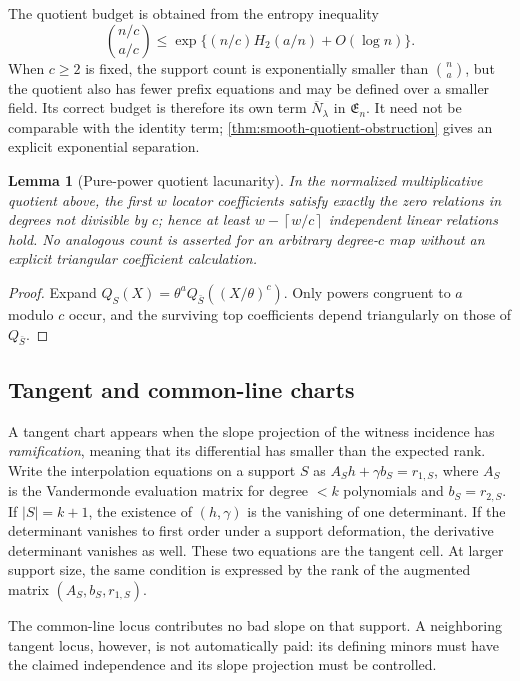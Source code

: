 \documentclass[12pt,a4paper]{amsart}
\numberwithin{equation}{section}
\newtheorem{lemma}[lemma]{Lemma}
\theoremstyle{remark}
\newcommand{\barN}{\overline N}
\newcommand{\Hb}{H_2}
\newcommand{\abs}[1]{\lvert #1\rvert}
\newcommand{\ceil}[1]{\left\lceil #1\right\rceil}
\begin{document}
The quotient budget is obtained from the entropy inequality
\[
        \binom{n/c}{a/c}\le \exp\{(n/c)\Hb(a/n)+O(\log n)\}.
\]
When \(c\ge2\) is fixed, the support count is exponentially smaller than
\(\binom na\), but the quotient also has fewer prefix equations and may be
defined over a smaller field.  Its correct budget is therefore its own
term \(\barN_\lambda\) in \(\mathfrak E_n\).  It need not be comparable
with the identity term; \cref{thm:smooth-quotient-obstruction} gives an
explicit exponential separation.

\begin{lemma}[Pure-power quotient lacunarity]\label{lem:quotient-lacunarity-expanded}
In the normalized multiplicative quotient above, the first \(w\) locator
coefficients satisfy exactly the zero relations in degrees not divisible
by \(c\); hence at least \(w-\ceil{w/c}\) independent linear relations
hold.  No analogous count is asserted for an arbitrary degree-\(c\) map
without an explicit triangular coefficient calculation.
\end{lemma}

\begin{proof}
Expand
\(Q_S(X)=\theta^aQ_{\bar S}((X/\theta)^c)\).  Only powers congruent to
\(a\) modulo \(c\) occur, and the surviving top coefficients depend
triangularly on those of \(Q_{\bar S}\).
\end{proof}

\subsection*{Tangent and common-line charts}
A tangent chart appears when the slope projection of the witness incidence
has \emph{ramification}, meaning that its differential has smaller than
the expected rank.  Write the interpolation equations on a support \(S\)
as \(A_S h+\gamma b_S=r_{1,S}\), where \(A_S\) is the Vandermonde
evaluation matrix for degree \(<k\) polynomials and \(b_S=r_{2,S}\).  If
\(\abs S=k+1\), the existence of \((h,\gamma)\) is the vanishing of one
determinant.  If the determinant vanishes to first order under a support
deformation, the derivative determinant vanishes as well.  These two
equations are the tangent cell.  At larger support size, the same condition
is expressed by the rank of the augmented matrix
\((A_S,b_S,r_{1,S})\).

The common-line locus contributes no bad slope on that support.  A
neighboring tangent locus, however, is not automatically paid: its defining
minors must have the claimed independence and its slope projection must be
controlled.
\end{document}

